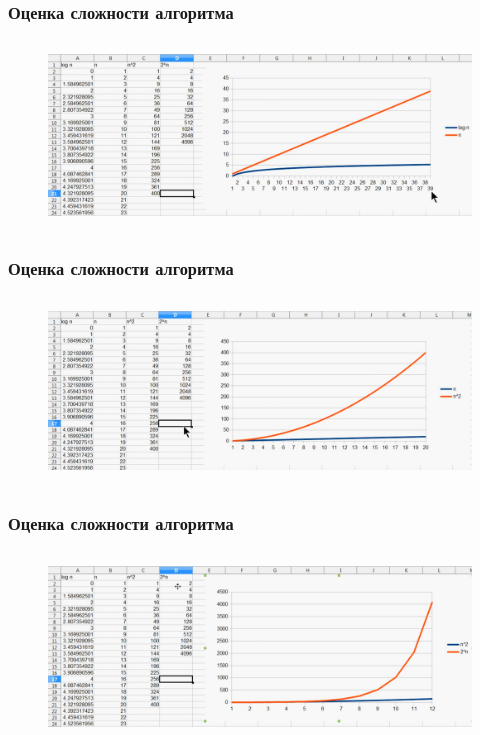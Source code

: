 \documentclass[russian, 12pt]{beamer}
\begin{document}
\begin{frame}
\frametitle{Оценка сложности алгоритма}
\begin{figure}
  \includegraphics[width=\linewidth, height=5cm]{img/scal_2.png}
\end{figure}
\end{frame}
\begin{frame}
\frametitle{Оценка сложности алгоритма}
\begin{figure}
  \includegraphics[width=\linewidth, height=5cm]{img/scal_3.png}
\end{figure}
\end{frame}
\begin{frame}
\frametitle{Оценка сложности алгоритма}
\begin{figure}
  \includegraphics[width=\linewidth, height=5cm]{img/scal_4.png}
\end{figure}
\end{frame}
\end{document}
